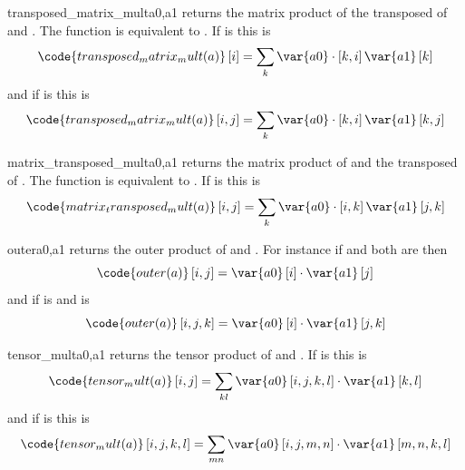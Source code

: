 \begin{funcdesc}{transposed_matrix_mult}{a0,a1}
returns the matrix product of the transposed of  and . The function is equivalent to
.
If  is \RankOne this is
\begin{equation}
\code{transposed_matrix_mult(a)}\left[i\right]=\sum_{k}\var{a0}  \cdot \left[k,i\right]\var{a1} \left[k\right]
\end{equation}
and if  is \RankTwo this is
\begin{equation}
\code{transposed_matrix_mult(a)}\left[i,j\right]=\sum_{k}\var{a0}  \cdot \left[k,i\right]\var{a1} \left[k,j\right]
\end{equation}
\end{funcdesc}

\begin{funcdesc}{matrix_transposed_mult}{a0,a1}
returns the matrix product of  and the transposed of .
The function is equivalent to
.
If  is \RankTwo this is
\begin{equation}
\code{matrix_transposed_mult(a)}\left[i,j\right]=\sum_{k}\var{a0}  \cdot \left[i,k\right]\var{a1} \left[j,k\right]
\end{equation}
\end{funcdesc}

\begin{funcdesc}{outer}{a0,a1}
returns the outer product of  and . For instance if  and  both are \RankOne then
\begin{equation}
\code{outer(a)}\left[i,j\right]=\var{a0} \left[i\right]  \cdot  \var{a1}\left[j\right]
\end{equation}
and if  is \RankOne and  is \RankThree
\begin{equation}
\code{outer(a)}\left[i,j,k\right]=\var{a0} \left[i\right] \cdot \var{a1}\left[j,k\right]
\end{equation}
\end{funcdesc}

\begin{funcdesc}{tensor_mult}{a0,a1}
returns the tensor product of  and . If  is \RankTwo this is
\begin{equation}
\code{tensor_mult(a)}\left[i,j\right]=\sum_{kl}\var{a0}\left[i,j,k,l\right] \cdot \var{a1} \left[k,l\right]
\end{equation}
and if  is \RankFour this is
\begin{equation}
\code{tensor_mult(a)}\left[i,j,k,l\right]=\sum_{mn}\var{a0} \left[i,j,m,n\right] \cdot \var{a1} \left[m,n,k,l\right]
\end{equation}
\end{funcdesc}

